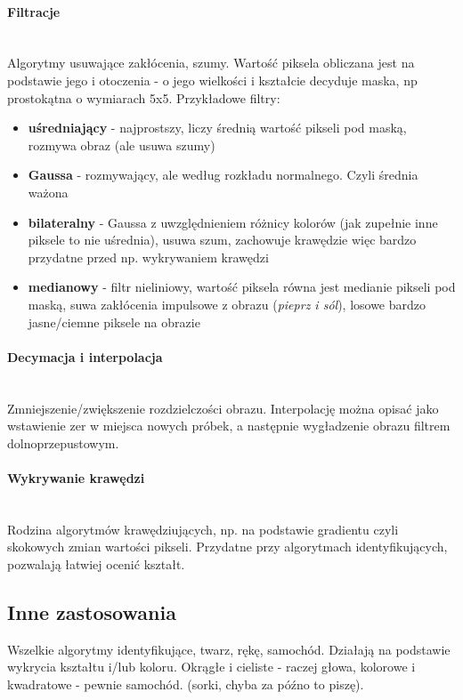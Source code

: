 \documentclass[]{report}
\begin{document}
\paragraph{Filtracje\\\\}
Algorytmy usuwające zakłócenia, szumy. Wartość piksela obliczana jest na podstawie jego i otoczenia - o jego wielkości i kształcie decyduje maska, np prostokątna o wymiarach 5x5. Przykładowe filtry:

\begin{itemize}
	\item \textbf{uśredniający} - najprostszy, liczy średnią wartość pikseli pod maską, rozmywa obraz (ale usuwa szumy)
	\item \textbf{Gaussa} - rozmywający, ale według rozkładu normalnego. Czyli średnia ważona
	\item \textbf{bilateralny} - Gaussa z uwzględnieniem różnicy kolorów (jak zupełnie inne piksele to nie uśrednia), usuwa szum, zachowuje krawędzie więc bardzo przydatne przed np. wykrywaniem krawędzi 
	\item \textbf{medianowy} - filtr nieliniowy, wartość piksela równa jest medianie pikseli pod maską, suwa zakłócenia impulsowe z obrazu (\textit{pieprz i sól}), losowe bardzo jasne/ciemne piksele na obrazie
\end{itemize}

\paragraph{Decymacja i interpolacja\\\\}
Zmniejszenie/zwiększenie rozdzielczości obrazu. Interpolację można opisać jako wstawienie zer w miejsca nowych próbek, a następnie wygładzenie obrazu filtrem dolnoprzepustowym.

\paragraph{Wykrywanie krawędzi\\\\}
Rodzina algorytmów krawędziujących, np. na podstawie gradientu czyli skokowych zmian wartości pikseli. Przydatne przy algorytmach identyfikujących, pozwalają łatwiej ocenić kształt.

\subsection{Inne zastosowania}
Wszelkie algorytmy identyfikujące, twarz, rękę, samochód. Działają na podstawie wykrycia kształtu i/lub koloru. Okrągłe i cieliste - raczej głowa, kolorowe i kwadratowe - pewnie samochód. (sorki, chyba za późno to piszę).
\end{document}

